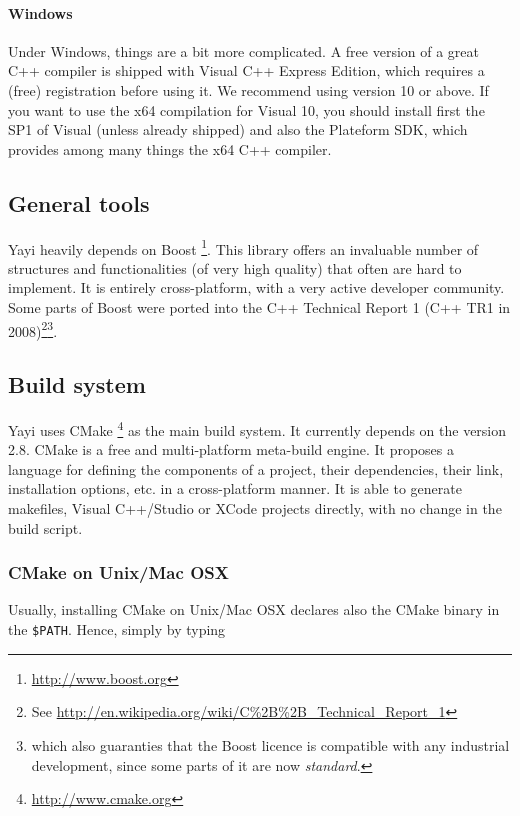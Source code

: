 \paragraph{Windows} Under Windows, things are a bit more complicated. A free version of a great C++ compiler is shipped with Visual C++ Express Edition, which requires a (free) registration before using it. We recommend using version 10 or above. If you want to use the x64 compilation for Visual 10, you should install first the SP1 of Visual (unless already shipped) and also the Plateform SDK, which provides among many things the x64 C++ compiler. 





\subsection{General tools}
Yayi heavily depends on Boost \cite{Boost} \footnote{\url{http://www.boost.org}}. This library offers an invaluable number of structures and functionalities (of very high quality) that often are hard to implement. It is entirely cross-platform, with a very active developer community. Some parts of Boost were ported into the C++ Technical Report 1 (C++ TR1 in 2008)\footnote{See \url{http://en.wikipedia.org/wiki/C\%2B\%2B_Technical_Report_1}}\footnote{which also guaranties that the Boost licence is compatible with any industrial development, since some parts of it are now \textit{standard}.}. 

\subsection{Build system}
Yayi uses CMake \footnote{\url{http://www.cmake.org}} as the main build system. It currently depends on the version 2.8. CMake is a free and multi-platform meta-build engine. It proposes a language for defining the components of a project, their dependencies, their link, installation options, etc. in a cross-platform manner. It is able to generate makefiles, Visual C++/Studio or XCode projects directly, with no change in the build script.

\subsubsection{CMake on Unix/Mac OSX}
Usually, installing CMake on Unix/Mac OSX declares also the CMake binary in the \verb'$PATH'. 
Hence, simply by typing 

